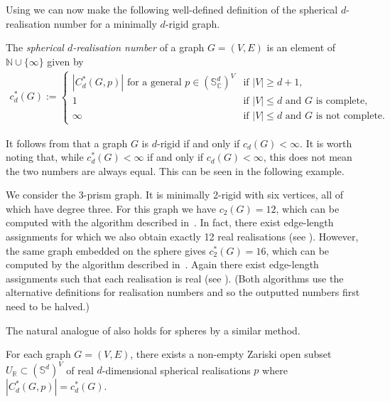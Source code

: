 Using  we can now make the following well-defined definition of the spherical $d$-realisation number for a minimally $d$-rigid graph.

\begin{definition}\label{def:countsphere}
	The \emph{spherical $d$-realisation number} of a graph $G=(V,E)$ is an element of $\mathbb{N} \cup \{\infty\}$ given by
	\begin{align*}
		c^*_d(G) :=		
		\begin{cases}
			|C^*_d(G,p)| \text{ for a general $p \in (\mathbb{S}_\mathbb{C}^d)^V$} &\text{if } |V| \geq d+1, \\
			 1 &\text{if } |V| \leq d \text{ and $G$ is complete}, \\
			 \infty &\text{if } |V| \leq d \text{ and $G$ is not complete}.
		\end{cases}
	\end{align*}
\end{definition}

It follows from  that a graph $G$ is $d$-rigid if and only if $c_d(G) < \infty$.
It is worth noting that,
while $c^*_d(G) < \infty$ if and only if $c_d(G) < \infty$,
this does not mean the two numbers are always equal.
This can be seen in the following example.

\begin{example}
  We consider the 3-prism graph.
  It is minimally 2-rigid with six vertices, all of which have degree three.
  For this graph we have $c_2(G)=12$, which can be computed with the algorithm described in~\cite{PlaneCount}.
  In fact, there exist edge-length assignments for which we also obtain exactly 12 real realisations (see ).
  However, the same graph embedded on the sphere gives $c_2^*(G)=16$,
  which can be computed by the algorithm described in~\cite{SphereCount}.
  Again there exist edge-length assignments such that each realisation is real (see ).
  (Both algorithms use the alternative definitions for realisation numbers and so the outputted numbers first need to be halved.)
\end{example}

The natural analogue of  also holds for spheres by a similar method.

\begin{corollary}\label{cor:sphrealstuff}
	For each graph $G=(V,E)$,
	there exists a non-empty Zariski open subset $U_\mathbb{R} \subset (\mathbb{S}^d)^V$ of real $d$-dimensional spherical realisations $p$ where $|C^*_d(G,p)| = c^*_d(G)$.
\end{corollary}

